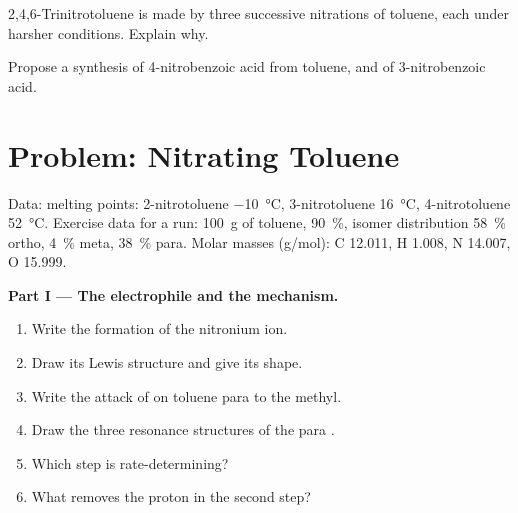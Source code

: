 \begin{exercise}[$\star\star\star$]\label{exo:b2:aromatic-substitution:11}
2,4,6-Trinitrotoluene is made by three successive nitrations of toluene, each under harsher
conditions. Explain why.
\end{exercise}

\begin{exercise}[$\star\star\star$]\label{exo:b2:aromatic-substitution:12}
Propose a synthesis of 4-nitrobenzoic acid from toluene, and of 3-nitrobenzoic acid.
\end{exercise}

\section{Problem: Nitrating Toluene}

\begin{problem}
\label{pb:b2:aromatic-substitution:1}
Data: melting points: 2-nitrotoluene \qty{-10}{\degreeCelsius}, 3-nitrotoluene
\qty{16}{\degreeCelsius}, 4-nitrotoluene \qty{52}{\degreeCelsius}. Exercise data for a run:
\qty{100}{g} of toluene,  90~\%, isomer distribution 58~\% ortho, 4~\% meta,
38~\% para. Molar masses (\unit{g/mol}): C 12.011, H 1.008, N 14.007, O 15.999.

\medskip
\noindent\textbf{Part I --- The electrophile and the mechanism.}
\begin{enumerate}
  \item Write the formation of the nitronium ion.
  \item Draw its Lewis structure and give its shape.
  \item Write the attack of  on toluene para to the methyl.
  \item Draw the three resonance structures of the para .
  \item Which step is rate-determining?
  \item What removes the proton in the second step?
\end{enumerate}


\end{problem}
